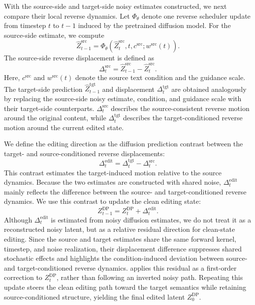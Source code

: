 With the source-side and target-side noisy estimates constructed, we next compare their local reverse dynamics.
Let $\Phi_\theta$ denote one reverse scheduler update from timestep $t$ to $t-1$ induced by the pretrained diffusion model.
For the source-side estimate, we compute
\begin{equation}
\hat{Z}^{\mathrm{src}}_{t-1}
=
\Phi_\theta
\left(
\hat{Z}^{\mathrm{src}}_t,
t,
c^{\mathrm{src}};
w^{\mathrm{src}}(t)
\right).
\end{equation}
The source-side reverse displacement is defined as
\begin{equation}
\Delta^{\mathrm{src}}_t
=
\hat{Z}^{\mathrm{src}}_{t-1}
-
\hat{Z}^{\mathrm{src}}_t .
\end{equation}
Here, $c^{\mathrm{src}}$ and $w^{\mathrm{src}}(t)$ denote the source text condition and the guidance scale. The target-side prediction $\hat{Z}^{\mathrm{tgt}}_{t-1}$ and displacement $\Delta^{\mathrm{tgt}}_t$ are obtained analogously by replacing the source-side noisy estimate, condition, and guidance scale with their target-side counterparts. $\Delta^{\mathrm{src}}_t$ describes the source-consistent reverse motion around the original content, while $\Delta^{\mathrm{tgt}}_t$ describes the target-conditioned reverse motion around the current edited state.

We define the editing direction as the diffusion prediction contrast between the target- and source-conditioned reverse displacements:
\begin{equation}
\Delta^{\mathrm{edit}}_t
=
\Delta^{\mathrm{tgt}}_t
-
\Delta^{\mathrm{src}}_t .
\end{equation}
This contrast estimates the target-induced motion relative to the source dynamics.
Because the two estimates are constructed with shared noise, $\Delta^{\mathrm{edit}}_t$ mainly reflects the difference between the source- and target-conditioned reverse dynamics. We use this contrast to update the clean editing state:
\begin{equation}
Z_{t-1}^{\text{DP}}
=
Z_t^{\text{DP}}
+
\Delta^{\mathrm{edit}}_t .
\end{equation}
Although $\Delta^{\text{edit}}_t$ is estimated from noisy diffusion estimates, we do not treat it as a reconstructed noisy latent, but as a relative residual direction for clean-state editing. Since the source and target estimates share the same forward kernel, timestep, and noise realization, their displacement difference suppresses shared stochastic effects and highlights the condition-induced deviation between source- and target-conditioned reverse dynamics. \ourmethod{} applies this residual as a first-order correction to $Z_t^{\text{DP}}$, rather than following an inverted noisy path. Repeating this update steers the clean editing path toward the target semantics while retaining source-conditioned structure, yielding the final edited latent $Z_0^{\text{DP}}$.

